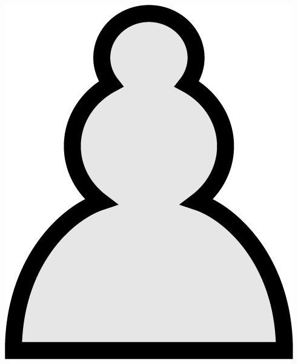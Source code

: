 \documentclass{article}
\begin{document}
\begin{itemize}
\begin{center}
    	\includegraphics[scale=0.1]{image6.png}
    \end{center}
\end{itemize}
\end{document}
